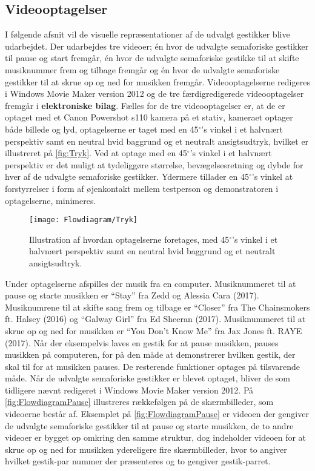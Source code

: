 \subsection{Videooptagelser}
\label{VideooptagelserValgAfGestikker}
%
I følgende afsnit vil de visuelle repræsentationer af de udvalgt gestikker blive udarbejdet. Der udarbejdes tre videoer; én hvor de udvalgte semaforiske gestikker til pause og start fremgår, én hvor de udvalgte semaforiske gestikke til at skifte musiknummer frem og tilbage fremgår og én hvor de udvalgte semaforiske gestikker til at skrue op og ned for musikken fremgår. Videooptagelserne redigeres i Windows Movie Maker version 2012 og de tre færdigredigerede videooptagelser fremgår i \textbf{elektroniske bilag}. 
\blankline
%
Fælles for de tre videooptagelser er, at de er optaget med et Canon Powershot s110 kamera på et stativ, kameraet optager både billede og lyd, optagelserne er taget med en 45$^{\circ}$'s vinkel i et halvnært perspektiv samt en neutral hvid baggrund og et neutralt ansigtsudtryk, hvilket er illustreret på \autoref{fig:Tryk}. Ved at optage med en 45$^{\circ}$'s vinkel i et halvnært perspektiv er det muligt at tydeliggøre størrelse, bevægelsesretning og dybde for hver af de udvalgte semaforiske gestikker. Ydermere tillader en 45$^{\circ}$'s vinkel at forstyrrelser i form af øjenkontakt mellem testperson og demonstratoren i optagelserne, minimeres. 
%
\begin{figure}[H]
	\centering
	\texttt{[image: Flowdiagram/Tryk]}
	\caption{Illustration af hvordan optagelserne foretages, med 45$^{\circ}$'s vinkel i et halvnært perspektiv samt en neutral hvid baggrund og et neutralt ansigtsudtryk.}
	\label{fig:Tryk}
\end{figure}
\noindent
%
Under optagelserne afspilles der musik fra en computer. Musiknummeret til at pause og starte musikken er \enquote{Stay} fra Zedd og Alessia Cara (2017). Musiknumrene til at skifte sang frem og tilbage er \enquote{Closer} fra The Chainsmokers ft. Halsey (2016) og \enquote{Galway Girl} fra Ed Sheeran (2017). Musiknummeret til at skrue op og ned for musikken er \enquote{You Don't Know Me} fra Jax Jones ft. RAYE (2017). Når der eksempelvis laves en gestik for at pause musikken, pauses musikken på computeren, for på den måde at demonstrerer hvilken gestik, der skal til for at musikken pauses. De resterende funktioner optages på tilsvarende måde.\blankline
%
Når de udvalgte semaforiske gestikker er blevet optaget, bliver de som tidligere nævnt redigeret i Windows Movie Maker version 2012. På \autoref{fig:FlowdiagramPause} illustreres rækkefølgen på de skærmbilleder, som videoerne består af. Eksemplet på \autoref{fig:FlowdiagramPause} er videoen der gengiver de udvalgte semaforiske gestikker til at pause og starte musikken, de to andre videoer er bygget op omkring den samme struktur, dog indeholder videoen for at skrue op og ned for musikken ydereligere fire skærmbilleder, hvor to angiver hvilket gestik-par nummer der præsenteres og to gengiver gestik-parret.       
